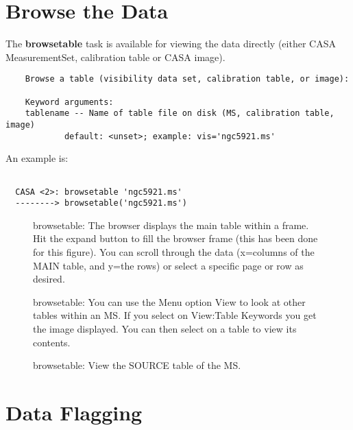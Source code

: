 \section{Browse the Data}
\label{section:browsing}

The {\bf browsetable} task is available for viewing the data directly
(either CASA MeasurementSet, calibration table or CASA image). 

\small
\begin{verbatim}
    Browse a table (visibility data set, calibration table, or image):
    
    Keyword arguments:
    tablename -- Name of table file on disk (MS, calibration table, image)
            default: <unset>; example: vis='ngc5921.ms'
\end{verbatim}
\normalsize

\noindent An example is:

\small
\begin{verbatim}

  CASA <2>: browsetable 'ngc5921.ms'
  --------> browsetable('ngc5921.ms')
\end{verbatim}
\normalsize

\begin{figure}[h!]
\caption{\label{fig:tablebrowser2} browsetable: The browser displays
  the main table within a frame. Hit the expand button to fill the
  browser frame (this has been done for this figure). You can scroll
  through the data (x=columns of the MAIN table, and y=the rows) or
  select a specific page or row as desired.} 
\hrulefill
\end{figure}

\begin{figure}[h!]
\caption{\label{fig:tablebrowser3} browsetable: You can use the Menu
  option View to look at other tables within an MS. If you select on
  View:Table Keywords you get the image displayed. You can then select
  on a table to view its contents.} 
\hrulefill
\end{figure}
 
\begin{figure}[h!]
\caption{\label{fig:tablebrowser4} browsetable: View the SOURCE table of the MS.}
\hrulefill
\end{figure}


\section{Data Flagging}
\label{section:flagging}


